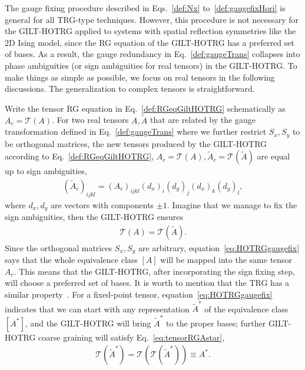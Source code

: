 \documentclass[aps,prr,reprint,superscriptaddress,floatfix]{revtex4-2}
\begin{document}
The gauge fixing procedure described in Eqs.~\eqref{def:Nx} to~\eqref{def:gaugefixHori} is general for all TRG-type techniques.
However, this procedure is not necessary for the GILT-HOTRG applied to systems with spatial reflection symmetries like the 2D Ising model, since the RG equation of the GILT-HOTRG has a preferred set of bases.
As a result, the gauge redundancy in Eq.~\eqref{def:gaugeTrans} collapses into phase ambiguities (or sign ambiguities for real tensors) in the GILT-HOTRG\@.
To make things as simple as possible, we focus on real tensors in the following discussions.
The generalization to complex tensors is straightforward.
%

Write the tensor RG equation in Eq.~\eqref{def:RGeqGiltHOTRG} schematically as $A_c = \mathcal{T}\left(A\right)$.
For two real tensors $A, \tilde{A}$ that are related by the gauge transformation defined in Eq.~\eqref{def:gaugeTrans} where we further restrict $S_x,S_y$ to be orthogonal matrices, the new tensors produced by the GILT-HOTRG according to Eq.~\eqref{def:RGeqGiltHOTRG}, $A_c = \mathcal{T}\left(A\right), \tilde{A}_c = \mathcal{T}(\tilde{A})$ are equal up to sign ambiguities,
%
\begin{align}\label{eq:signAmbi}
    \left(\tilde{A}_c \right)_{ijkl} =
    \left(A_c\right)_{ijkl}(d_x)_i (d_y)_j (d_x)_k (d_y)_l, 
\end{align}
%
where $d_x,d_y$ are vectors with components $\pm 1$. 
Imagine that we manage to fix the sign ambiguities, then the GILT-HOTRG ensures
%
\begin{align}\label{eq:HOTRGgaugefix}
    \mathcal{T}(A) = \mathcal{T}(\tilde{A}).
\end{align}
%
Since the orthogonal matrices $S_x, S_y$ are arbitrary, equation~\eqref{eq:HOTRGgaugefix} says that the whole equivalence class $[A]$ will be mapped into the same tensor $A_c$. 
This means that the GILT-HOTRG, after incorporating the sign fixing step, will choose a preferred set of bases. 
It is worth to mention that the TRG has a similar property~\cite{kadanoff2014}.
For a fixed-point tensor, equation~\eqref{eq:HOTRGgaugefix} indicates that we can start with any representation $\tilde{A}^*$ of the equivalence class $[A^*]$, and the GILT-HOTRG will bring $\tilde{A}^*$ to the proper bases; further GILT-HOTRG coarse graining will satisfy Eq.~\eqref{eq:tensorRGAstar},
%
\begin{align}\label{eq:GiltHOTRGfixT}
    \mathcal{T}(\tilde{A}^*) =
    \mathcal{T}\left(\mathcal{T}(\tilde{A}^*)  \right) \equiv A^*.
\end{align}
%
\end{document}

